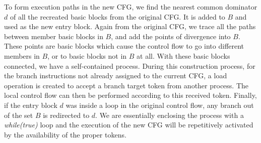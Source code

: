 \documentclass{sig-alternate}
\begin{document}
To form execution paths in the new CFG, we find the nearest common dominator $d$ of all the recreated basic blocks from the original CFG. It is added to $B$ and used as the new entry block. Again from the original CFG, we trace all the paths between member basic blocks in $B$, and add the points of divergence into $B$. These points are basic blocks which cause
the control flow to go into different members in $B$, or to basic blocks not in $B$ at all.
With these basic blocks connected, we have a self-contained process. 
During this construction process, for the branch instructions not already assigned to the current CFG, a load operation is created to accept a branch target token from another process. The local control flow can then be performed according to this received token. 
Finally, if the entry block $d$ was inside a loop in the original control flow, any branch out of the set $B$ is redirected to $d$. We are essentially enclosing the process with a \textit{while(true)} loop and the execution of the new CFG will be repetitively activated by the availability of the proper tokens.
\end{document}
